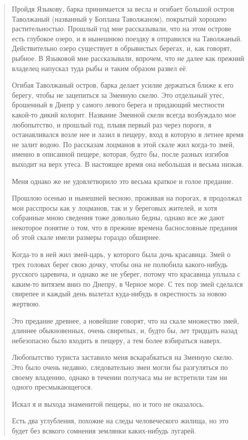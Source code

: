 \begin{quotation}
Пройдя Языкову, барка принимается за весла и огибает большой  остров Таволжаный (названный у Боплана Таволжаном), покрытый хорошею растительностью. Прошлый год мне рассказывали, что на этом острове есть глубокое озеро, и в нынешнюю поездку я отправился на Таволжаный. Действительно озеро существует в обрывистых берегах, и, как говорят, рыбное. В Языковой мне рассказывали, впрочем, что не далее как прежний владелец напускал туда рыбы и таким образом развел её. 

Огибая Таволжаный остров, барка делает усилие держаться ближе к его берегу, чтобы не зацепиться за Змеиную скелю. Это отдельный утес, брошенный в Днепр у самого левого берега и придающий местности какой-то дикий колорит. Название Змеиной скели всегда возбуждало мое любопытство, и прошлый год, плывя первый раз через пороги, я останавливался возле нее и лазил в пещеру, вход в которую в летнее время не залит водою. По рассказам лоцманов в этой скале жил когда-то змей, именно в описанной пещере, которая, будто бы, после разных изгибов выходит на верх утеса. В настоящее время она небольшая и весьма низкая.

Меня однако же не удовлетворило это весьма краткое и голое предание.

Прошлою осенью и нынешней весною, проживая на порогах, я продолжал мои расспросы как у лоцманов, так и у береговых жителей, и хотя собранные мною сведения тоже довольно бедны, однако все же дают некоторое понятие о том, что в прежние времена баснословные предания об этой скале имели размеры гораздо обширнее. 

Когда-то в ней жил змей-царь, у которого была дочь красавица. Змей о трех головах берег свою дочку, чтобы она не полюбила какого-нибудь русского царевича, и однако же не уберег, потому что красавица уплыла с каким-то витязем вниз по Днепру, в Черное море. С тех пор змей сделался свирепее и каждый день вылетал куда-нибудь в окрестность за новою жертвою.

Это предание древнее, а новейшие говорят, что на скале множество змей, длиннее обыкновенных, очень свирепых, и, будто бы, лет тридцать назад небезопасно было входить в пещеру, а тем более взбираться наверх.

Любопытство туриста заставило меня вскарабкаться на Змеиную скелю. Это было очень недавно, следовательно змеи могли бы разгуляться по своему владению, однако в течении получаса мы не встретили там ни одного пресмыкающегося.

Искал я и выхода знаменитой пещеры, но и того не оказалось. 

Есть два углубления, похожие на следы человеческого жилища, но это будет без всякого сомнения землянки каких-нибудь лугарей.
\end{quotation}
 
